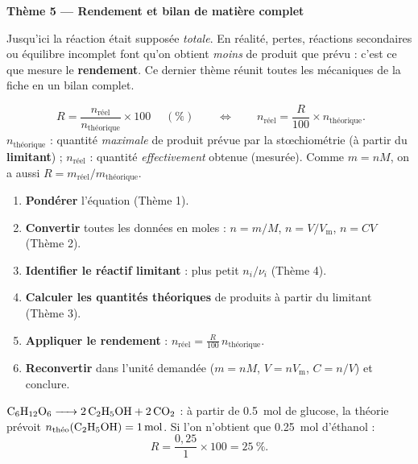 \documentclass[11pt,a4paper]{article}
\begin{document}

\begin{center}
{\Large\bfseries\color{primarydark} Thème 5 — Rendement et bilan de matière complet}
\end{center}

\medskip
Jusqu'ici la réaction était supposée \emph{totale}. En réalité, pertes, réactions secondaires ou
équilibre incomplet font qu'on obtient \emph{moins} de produit que prévu : c'est ce que mesure le
\textbf{rendement}. Ce dernier thème réunit toutes les mécaniques de la fiche en un bilan complet.

\begin{cle}
\[
\boxed{\;R=\dfrac{n_{\text{réel}}}{n_{\text{théorique}}}\times 100\;}\quad(\si{\percent})
\qquad\Longleftrightarrow\qquad
n_{\text{réel}}=\dfrac{R}{100}\times n_{\text{théorique}}.
\]
$n_{\text{théorique}}$ : quantité \emph{maximale} de produit prévue par la stœchiométrie (à partir du
\textbf{limitant}) ; $n_{\text{réel}}$ : quantité \emph{effectivement} obtenue (mesurée). Comme
$m=nM$, on a aussi $R=m_{\text{réel}}/m_{\text{théorique}}$.
\end{cle}

\begin{methode}
\begin{enumerate}[leftmargin=1.7em,topsep=2pt,itemsep=1pt]
  \item \textbf{Pondérer} l'équation (Thème 1).
  \item \textbf{Convertir} toutes les données en moles : $n=m/M$, $n=V/V_{\mathrm{m}}$, $n=CV$ (Thème 2).
  \item \textbf{Identifier le réactif limitant} : plus petit $n_i/\nu_i$ (Thème 4).
  \item \textbf{Calculer les quantités théoriques} de produits à partir du limitant (Thème 3).
  \item \textbf{Appliquer le rendement} : $n_{\text{réel}}=\frac{R}{100}\,n_{\text{théorique}}$.
  \item \textbf{Reconvertir} dans l'unité demandée ($m=nM$, $V=nV_{\mathrm{m}}$, $C=n/V$) et conclure.
\end{enumerate}
\end{methode}

\begin{exemplebox}
$\ce{C6H12O6 -> 2 C2H5OH + 2 CO2}$ : à partir de \qty{0.5}{\mole} de glucose, la théorie prévoit
$n_{\text{théo}}(\ce{C2H5OH})=1\,\si{\mole}$. Si l'on n'obtient que \qty{0.25}{\mole} d'éthanol :
\[
R=\dfrac{0,25}{1}\times100=\qty{25}{\percent}.
\]
\end{exemplebox}
\end{document}
